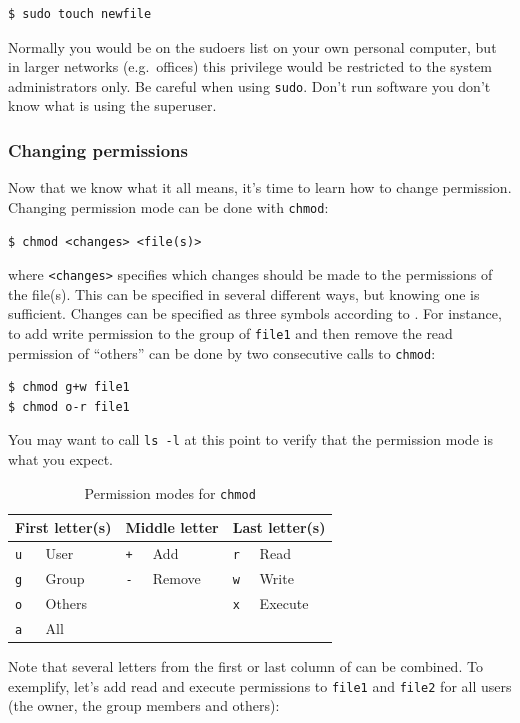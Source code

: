 \begin{verbatim}
$ sudo touch newfile
\end{verbatim}
Normally you would be on the sudoers list on your own personal computer, but in larger networks (e.g.\ offices) this privilege would be restricted to the system administrators only. Be careful when using \verb|sudo|. Don't run software you don't know what is using the superuser.

\subsubsection{Changing permissions}
Now that we know what it all means, it's time to learn how to change permission. Changing permission mode can be done with \verb|chmod|:

\begin{verbatim}
$ chmod <changes> <file(s)>
\end{verbatim}
where \verb|<changes>| specifies which changes should be made to the permissions of the file(s). This can be specified in several different ways, but knowing one is sufficient. Changes can be specified as three symbols according to . For instance, to add write permission to the group of \verb|file1| and then remove the read permission of ``others'' can be done by two consecutive calls to \verb|chmod|:

\begin{verbatim}
$ chmod g+w file1
$ chmod o-r file1
\end{verbatim}
You may want to call \verb|ls -l| at this point to verify that the permission mode is what you expect.

\begin{table}
	\centering
	\caption{Permission modes for \texttt{chmod}}
	\begin{tabular}{ll|ll|ll}
	\hline
	\multicolumn{2}{c}{First letter(s)} & \multicolumn{2}{|c|}{Middle letter}  & \multicolumn{2}{c}{Last letter(s)}  \\
	\hline
	\verb|u|		&	User		& \verb|+|	& Add		& \verb|r|	& Read		\\
	\verb|g|		&	Group	& \verb|-|	& Remove		& \verb|w|	& Write		\\
	\verb|o|		&	Others	& 			&			& \verb|x|	& Execute	\\
	\verb|a|		&	All		&			&			&			&
	\end{tabular}
	\label{tab:bash:chmod}
\end{table}

Note that several letters from the first or last column of  can be combined. To exemplify, let's add read and execute permissions to \verb|file1| and \verb|file2| for all users (the owner, the group members and others):

